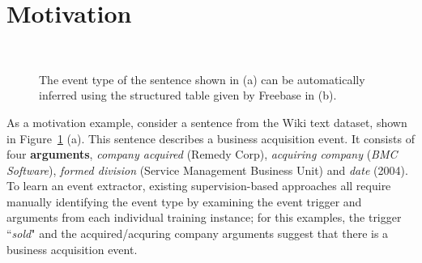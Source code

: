 \section{Motivation}
\begin{figure}
  \centering
   \\
  \caption{The event type of the sentence shown in (a) can be automatically inferred using the structured table given by Freebase in (b).}
  \label{fig:example}
\end{figure}


As a motivation example, consider a sentence from the Wiki text dataset, shown in Figure~\ref{fig:example} (a). This sentence describes a
business acquisition event. It consists of four \textbf{arguments}, \emph{company acquired} (Remedy Corp), \emph{acquiring company}
(\emph{BMC Software}), \emph{formed division} (Service Management Business Unit) and \emph{date} (2004). To learn an event extractor,
existing supervision-based approaches all require manually identifying the event type by examining the event trigger and arguments from
each individual training instance; for this examples, the trigger ``\emph{sold}" and the acquired/acquring company arguments suggest that
there is a business acquisition event.

